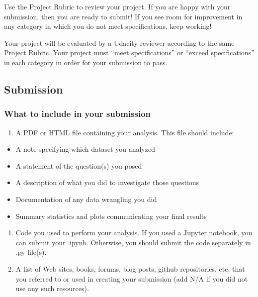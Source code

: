 \documentclass[]{book}
\providecommand{\tightlist}{%
  \setlength{\itemsep}{0pt}\setlength{\parskip}{0pt}}
\begin{document}
Use the Project Rubric to review your project. If you are happy with
your submission, then you are ready to submit! If you see room for
improvement in any category in which you do not meet specifications,
keep working!

Your project will be evaluated by a Udacity reviewer according to the
same Project Rubric. Your project must ``meet specifications'' or
``exceed specifications'' in each category in order for your submission
to pass.

\subsection{Submission}\label{submission}

\subsubsection{What to include in your
submission}\label{what-to-include-in-your-submission}

\begin{enumerate}
\def\labelenumi{\arabic{enumi}.}
\tightlist
\item
  A PDF or HTML file containing your analysis. This file should include:
\end{enumerate}

\begin{itemize}
\tightlist
\item
  A note specifying which dataset you analyzed
\item
  A statement of the question(s) you posed
\item
  A description of what you did to investigate those questions
\item
  Documentation of any data wrangling you did
\item
  Summary statistics and plots communicating your final results
\end{itemize}

\begin{enumerate}
\def\labelenumi{\arabic{enumi}.}
\setcounter{enumi}{1}
\tightlist
\item
  Code you used to perform your analysis. If you used a Jupyter
  notebook, you can submit your .ipynb. Otherwise, you should submit the
  code separately in .py file(s).
\item
  A list of Web sites, books, forums, blog posts, github repositories,
  etc. that you referred to or used in creating your submission (add N/A
  if you did not use any such resources).
\end{enumerate}
\end{document}
